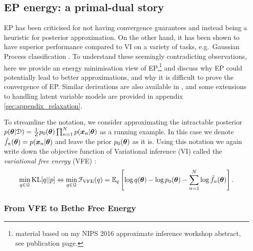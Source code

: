 \subsection{EP energy: a primal-dual story}
\label{sec:chap2_ep_energy}

EP has been criticised for not having convergence guarantees and instead being a heuristic for posterior approximation. On the other hand, it has been shown to have superior performance compared to VI on a variety of tasks, e.g.~Gaussian Process classification \citep{kuss:gpep2005}. To understand these seemingly contradicting observations, here we provide an energy minimisation view of EP,\footnote{material based on my NIPS 2016 approximate inference workshop abstract, see publication page.} and discuss why EP could potentially lead to better approximations, and why it is difficult to prove the convergence of EP. Similar derivations are also available in \citet{yedidia:bethe2001, heskes:ep2002, minka:divergence2005, opper:ec2005, wainwright:graphical2008}, and some extensions to handling latent variable models are provided in appendix \ref{sec:appendix_relaxation}.

To streamline the notation, we consider approximating the intractable posterior $p(\bm{\theta}|\mathcal{D}) = \frac{1}{Z} p_0(\bm{\theta}) \prod_{n=1}^N p(\bm{x}_n|\bm{\theta})$ as a running example. In this case we denote $\tilde{f}_n(\bm{\theta}) = p(\bm{x}_n|\bm{\theta})$ and leave the prior $p_0(\bm{\theta})$ as it is. Using this notation we again write down the objective function of Variational inference (VI) called the \emph{variational free energy} (VFE) \citep{jordan:vi1999, beal:vi2003}:
\begin{equation}
\min_{q \in \mathcal{Q}} \mathrm{KL}[q||p] \Leftrightarrow \min_{q \in \mathcal{Q}} \mathcal{F}_{\text{VFE}}(q) = \mathbb{E}_{q} \left[ \log q(\bm{\theta}) - \log p_0(\bm{\theta}) - \sum_{n=1}^N \log \tilde{f}_n(\bm{\theta}) \right].
\label{eq:ep_section_vfe}
\end{equation}

\subsubsection{From VFE to Bethe Free Energy}
\label{sec:vfe_to_bethe}

